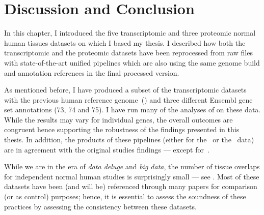 \section{Discussion and Conclusion}

In this chapter, I introduced the five transcriptomic and three proteomic normal
human tissues datasets on which I based my thesis.
I described how both the transcriptomic and the proteomic datasets have been
reprocessed from raw files with state-of-the-art unified pipelines
which are also using the same genome build and annotation references in the
final processed version.

As mentioned before,
I have produced a subset of the transcriptomic datasets
with the previous human reference genome~() and
three different \gls{Ensembl} gene set annotations (73, 74 and 75).
I have run many of the analyses of  on
these data.
While the results may vary for individual genes,
the overall outcomes are congruent hence
supporting the robustness of the findings presented in this thesis.
In addition, the products of these pipelines (either for the \Rnaseq\ or the \ms\
data) are in agreement with the original studies findings ---
except for~\citet{PandeyData}.

While we are in the era of \emph{data deluge} and \emph{big data},
the number of tissue overlaps for independent normal human studies is surprisingly small
--- see \Crefp{fig:VennStudiesT}.
Most of these datasets have been (and will be) referenced through
many papers for comparison (or as control) purposes;
hence, it is essential to assess the soundness of these practices by assessing
the consistency between these datasets.

